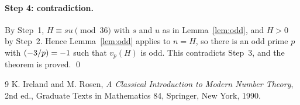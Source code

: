 \documentclass[11pt]{article}
\newcommand{\leg}[2]{\mathchoice{\biggl(\dfrac{#1}{#2}\biggr)}{(#1/#2)}{(#1/#2)}{(#1/#2)}}
\begin{document}
\paragraph{Step 4: contradiction.} By Step~1, $H\equiv su\pmod{36}$ with $s$ and $u$ as in Lemma~\ref{lem:odd}, and $H>0$ by Step~2. Hence Lemma~\ref{lem:odd} applies to $n=H$, so there is an odd prime $p$ with $\leg{-3}{p}=-1$ such that $v_p(H)$ is odd. This contradicts Step~3, and the theorem is proved.
\qed

\begin{thebibliography}{9}
 K. Ireland and M. Rosen, \emph{A Classical Introduction to Modern Number Theory}, 2nd ed., Graduate Texts in Mathematics 84, Springer, New York, 1990.
\end{thebibliography}
\end{document}
